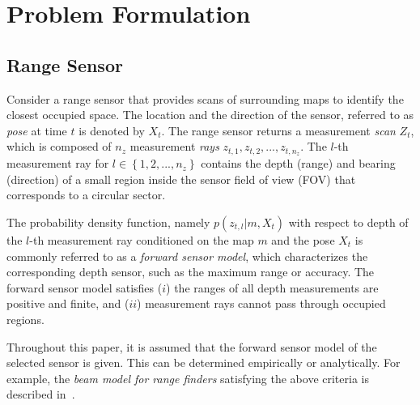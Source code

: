 \documentclass[letterpaper, 10pt, conference]{ieeeconf}
\newcommand{\braces}[1]{\ensuremath{\left\{ #1 \right\}}}
\begin{document}
\section{Problem Formulation}
\label{sec:ProbForm}

\subsection{Range Sensor}

Consider a range sensor that provides scans of surrounding maps to identify the closest occupied space. The location and the direction of the sensor, referred to as \emph{pose} at time $t$ is denoted by $X_t$. The range sensor returns a measurement \emph{scan} $Z_t$, which is composed of $n_z$ measurement \emph{rays} $z_{t,1},z_{t,2},...,z_{t,n_z}$. The $l$-th measurement ray for $l\in\braces{1,2,...,n_z}$ contains the depth (range) and bearing (direction) of a small region inside the sensor field of view (FOV) that corresponds to a circular sector.

The probability density function, namely $p(z_{t,l}|m,X_t)$ with respect to depth of the $l$-th measurement ray conditioned on the map $m$ and the pose $X_t$ is commonly referred to as a \emph{forward sensor model}, which characterizes the corresponding depth sensor, such as the maximum range or accuracy. The forward sensor model satisfies  ($i$) the ranges of all depth measurements are positive and finite, and ($ii$) measurement rays cannot pass through occupied regions.

Throughout this paper, it is assumed that the forward sensor model of the selected sensor is given. This can be determined empirically or analytically. For example, the \emph{beam model for range finders} satisfying  the above criteria is described in~\cite{ThrBurFox05}.
\end{document}

